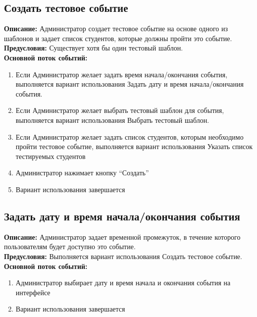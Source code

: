 \documentclass{article}
\begin{document}
    
    \subsection{Создать тестовое событие}
    \textbf{Описание:} Администратор создает тестовое событие на основе одного
    из шаблонов и задает список студентов, которые должны пройти это событие.\\
    \textbf{Предусловия:} Существует хотя бы один тестовый шаблон.\\
    \textbf{Основной поток событий:}
    \begin{enumerate}
        \item Если Администратор желает задать время начала/окончания события, выполняется вариант использования Задать дату и время начала/окончания события.
        \item Если Администратор желает выбрать тестовый шаблон для события, выполняется вариант использования Выбрать тестовый шаблон.
        \item Если Администратор желает задать список студентов, которым необходимо пройти тестовое событие, выполняется вариант использования Указать список тестируемых студентов
        \item Администратор нажимает кнопку “Создать”
        \item Вариант использования завершается
    \end{enumerate}


    \subsection{Задать дату и время начала/окончания события}
    \textbf{Описание:} Администратор задает временной промежуток, в течение
    которого пользователям будет доступно это событие.\\
    \textbf{Предусловия:} Выполняется вариант использования Создать тестовое
    событие.\\
    \textbf{Основной поток событий:}
    \begin{enumerate}
        \item Администратор выбирает дату и время начала и окончания события на интерфейсе
        \item Вариант использования завершается
    \end{enumerate}
\end{document}
